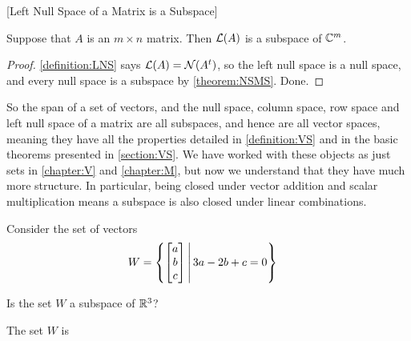\documentclass{ximera}
\begin{document}
\begin{theorem}
  \label{theorem:LNSMS}
  [Left Null Space of a Matrix is a Subspace]
  
  Suppose that $A$ is an $m\times n$ matrix.  Then $\mathcal{L}\!\left(A\right)$ is a subspace of $\mathbb{C}^{m}$.
  
  \begin{proof}
    \ref{definition:LNS} says $\mathcal{L}\!\left(A\right)=\mathcal{N}\!\left(A^{t}\right)$, so the
    left null space is a null space, and every null space is a
    subspace by \ref{theorem:NSMS}.  Done.
  \end{proof}
\end{theorem}

So the span of a set of vectors, and the null space, column space, row
space and left null space of a matrix are all subspaces, and hence are
all vector spaces, meaning they have all the properties detailed in
\ref{definition:VS} and in the basic theorems presented in
\ref{section:VS}.  We have worked with these objects as just sets in
\ref{chapter:V} and \ref{chapter:M}, but now we understand that they
have much more structure.  In particular, being closed under vector
addition and scalar multiplication means a subspace is also closed
under linear combinations.

\begin{question}
  Consider the set of vectors
  \begin{align*}
    W&=\left\lbrace\begin{bmatrix}a\\b\\c\end{bmatrix}\,\middle|\,3a-2b+c=0\right\rbrace
  \end{align*}

  Is the set $W$ a subspace of $\mathbb{R}^{3}$?
  \begin{multipleChoice}
  \end{multipleChoice}

  \begin{question}
    The set $W$ is 
    \begin{multipleChoice}
    \end{multipleChoice}
  \end{question}
  
\end{question}
\end{document}

